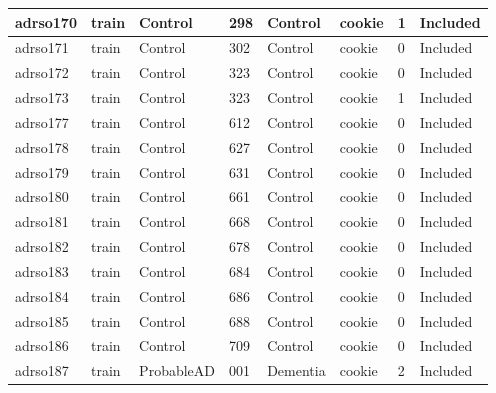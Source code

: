 \begin{center}
\begin{longtable}{|l|l|l|l|l|l|l|l|}
adrso170  & train            & Control      & 298         & Control              & cookie          & 1                & Included      \\ \hline
adrso171  & train            & Control      & 302         & Control              & cookie          & 0                & Included      \\ \hline
adrso172  & train            & Control      & 323         & Control              & cookie          & 0                & Included      \\ \hline
adrso173  & train            & Control      & 323         & Control              & cookie          & 1                & Included      \\ \hline
adrso177  & train            & Control      & 612         & Control              & cookie          & 0                & Included      \\ \hline
adrso178  & train            & Control      & 627         & Control              & cookie          & 0                & Included      \\ \hline
adrso179  & train            & Control      & 631         & Control              & cookie          & 0                & Included      \\ \hline
adrso180  & train            & Control      & 661         & Control              & cookie          & 0                & Included      \\ \hline
adrso181  & train            & Control      & 668         & Control              & cookie          & 0                & Included      \\ \hline
adrso182  & train            & Control      & 678         & Control              & cookie          & 0                & Included      \\ \hline
adrso183  & train            & Control      & 684         & Control              & cookie          & 0                & Included      \\ \hline
adrso184  & train            & Control      & 686         & Control              & cookie          & 0                & Included      \\ \hline
adrso185  & train            & Control      & 688         & Control              & cookie          & 0                & Included      \\ \hline
adrso186  & train            & Control      & 709         & Control              & cookie          & 0                & Included      \\ \hline
adrso187  & train            & ProbableAD   & 001         & Dementia             & cookie          & 2                & Included      \\ \hline

\end{longtable}
\end{center}
